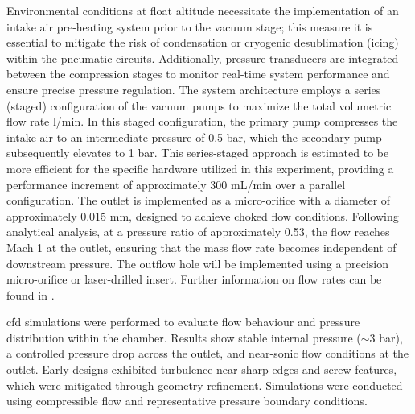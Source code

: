 Environmental conditions at float altitude necessitate the implementation of an intake air pre-heating system prior to the vacuum stage; this measure it is essential to mitigate the risk of condensation or cryogenic desublimation (icing) within the pneumatic circuits.
Additionally, pressure transducers are integrated between the compression stages to monitor real-time system performance and ensure precise pressure regulation.
The system architecture employs a series (staged) configuration of the vacuum pumps to maximize the total volumetric flow rate l/min.
In this staged configuration, the primary pump compresses the intake air to an intermediate pressure of 0.5 bar, which the secondary pump subsequently elevates to 1 bar.
This series-staged approach is estimated to be more efficient for the specific hardware utilized in this experiment, providing a performance increment of approximately 300 mL/min over a parallel configuration.
The outlet is implemented as a micro-orifice with a diameter of approximately 0.015 mm, designed to achieve choked flow conditions.
Following analytical analysis, at a pressure ratio of approximately 0.53, the flow reaches Mach 1 at the outlet, ensuring that the mass flow rate becomes independent of downstream pressure.
The outflow hole will be implemented using a precision micro-orifice or laser-drilled insert.
Further information on flow rates can be found in  .\par 

\gls{cfd} simulations were performed to evaluate flow behaviour and pressure distribution within the chamber.
Results show stable internal pressure ($\sim3$ bar), a controlled pressure drop across the outlet, and near-sonic flow conditions at the outlet.
Early designs exhibited turbulence near sharp edges and screw features, which were mitigated through geometry refinement.
Simulations were conducted using compressible flow and representative pressure boundary conditions.\par 

